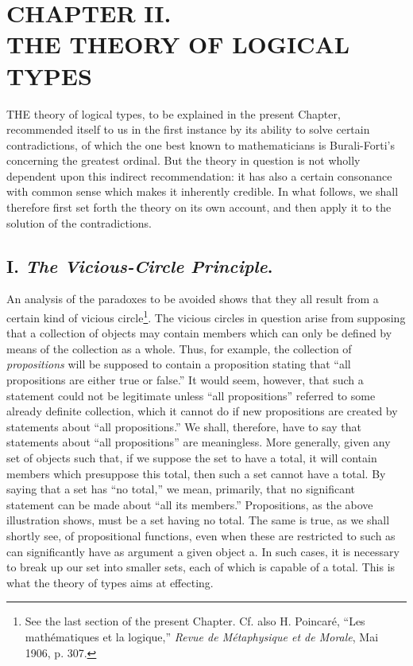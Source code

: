 \documentclass[letterpaper,12pt,openany,leqno]{book}
\newcommand{\pagefirst}[1]{\marginnote[\boxed{\text{#1}}]{\boxed{\text{#1}}}}
\begin{document}
\chapter*{\centering CHAPTER II. \\ THE THEORY OF LOGICAL TYPES}  \pagefirst{39} 

THE theory of logical types, to be explained in the present Chapter, recommended itself to us in the first instance by its ability to solve certain contradictions, of which the one best known to mathematicians is Burali-Forti's concerning the greatest ordinal. But the theory in question is not wholly dependent upon this indirect recommendation: it has also a certain consonance with common sense which makes it inherently credible. In what follows, we shall therefore first set forth the theory on its own account, and then apply it to the solution of the contradictions.

\section*{\centering I. \textit{The Vicious-Circle Principle}.} 

An analysis of the paradoxes to be avoided shows that they all result from a certain kind of vicious circle\footnote{See the last section of the present Chapter. Cf. also H. Poincar\'e, ``Les math\'ematiques et la logique,'' \textit{Revue de M\'etaphysique et de Morale}, Mai 1906, p. 307.}. The vicious circles in question arise from supposing that a collection of objects may contain members which can only be defined by means of the collection as a whole. Thus, for example, the collection of \textit{propositions} will be supposed to contain a proposition stating that ``all propositions are either true or false.'' It would seem, however, that such a statement could not be legitimate unless ``all propositions'' referred to some already definite collection, which it cannot do if new propositions are created by statements about ``all propositions.'' We shall, therefore, have to say that statements about ``all propositions'' are meaningless. More generally, given any set of objects such that, if we suppose the set to have a total, it will contain members which presuppose this total, then such a set cannot have a total. By saying that a set has ``no total,'' we mean, primarily, that no significant statement can be made about ``all its members.'' Propositions, as the above illustration shows, must be a set having no total. The same is true, as we shall shortly see, of propositional functions, even when these are restricted to such as can significantly have as argument a given object a. In such cases, it is necessary to break up our set into smaller sets, each of which is capable of a total. This is what the theory of types aims at effecting.
\end{document}
